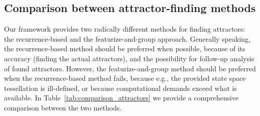 \documentclass[9pt,twocolumn,twoside,lineno]{pnas-new}
\begin{document}
\subsection{Comparison between attractor-finding methods} 
\label{sec:compmeth}
Our framework provides two radically different methods for finding attractors: the recurrence-based and the featurize-and-group approach. Generally speaking, the recurrence-based method should be preferred when possible, because of its accuracy (finding the actual attractors), and the possibility for follow-up analysis of found attractors. However, the featurize-and-group method should be preferred when the recurrence-based method fails, because e.g., the provided state space tessellation is ill-defined, or because computational demands exceed what is available. In Table~\ref{tab:comparison_attractors} we provide a comprehensive comparison between the two methods.
\end{document}
